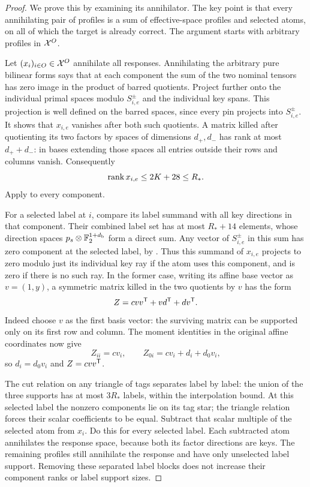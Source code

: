 \begin{proof}
We prove this by examining its annihilator.  The key point is that
every annihilating pair of profiles is a sum of effective-space
profiles and selected atoms, on all of which the target is already
correct.  The argument starts with arbitrary profiles in $\mathcal X^O$.

Let $(x_i)_{i\in O}\in\mathcal X^O$ annihilate all responses.
Annihilating the arbitrary pure bilinear forms says that at
each component the sum of the two nominal tensors has zero
image in the product of barred quotients.  Project further
onto the individual primal spaces modulo
$S_{i,e}^{\pm}$ and the individual key spans.  This projection
is well defined on the barred spaces, since every pin
projects into $S_{i,e}^{\pm}$.  It shows that $x_{i,e}$ vanishes
after both such quotients.  A matrix killed after quotienting
its two factors by spaces of dimensions $d_+,d_-$ has rank
at most $d_++d_-$: in bases extending those spaces all entries
outside their rows and columns vanish.  Consequently
\[
 \operatorname{rank} x_{i,e}\le2K+28\le R_*.
\]
Apply  to every component.

For a selected label at $i$, compare its label summand with
all key directions in that component.  Their combined label
set has at most $R_*+14$ elements, whose direction spaces
$p_s\otimes\mathbb F_2^{1+d_{\mathrm b}}$ form a direct sum.  Any vector of
$S_{i,e}^{\pm}$ in this sum has zero component at the selected label,
by .  Thus this summand of $x_{i,e}$
projects to zero modulo just its individual key ray if the
atom uses this component, and is zero if there is no such
ray.  In the former case, writing its affine base vector as
$v=(1,y)$, a symmetric matrix killed in the two quotients
by $v$ has the form
\[
 Z=cvv^{\mathsf T}+vd^{\mathsf T}+dv^{\mathsf T}.
\]
Indeed choose $v$ as the first basis vector: the surviving
matrix can be supported only on its first row and column.
The moment identities in the original affine coordinates
now give
\[
 Z_{ii}=cv_i,\qquad Z_{0i}=cv_i+d_i+d_0v_i,
\]
so $d_i=d_0v_i$ and $Z=cvv^{\mathsf T}$.

The cut relation on any triangle of tags separates label by
label: the union of the three supports has at most $3R_*$
labels, within the interpolation bound.  At this selected
label the nonzero components lie on its tag star; the
triangle relation forces their scalar coefficients to be
equal.  Subtract that scalar multiple of the selected atom
from $x_i$.  Do this for every selected label.  Each subtracted
atom annihilates the response space, because both its factor
directions are keys.  The remaining profiles still
annihilate the response and have only unselected label
support.  Removing these separated label blocks does not
increase their component ranks or label support sizes.


\end{proof}
